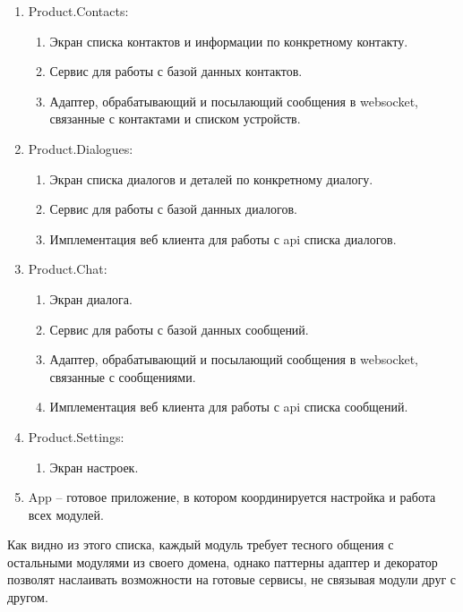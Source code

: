 \begin{enumerate}
	\item Product.Contacts:
	\begin{enumerate}
		\item Экран списка контактов и информации по конкретному контакту.
		\item Сервис для работы с базой данных контактов.
		\item Адаптер, обрабатывающий и посылающий сообщения в websocket, связанные с контактами и списком устройств.
	\end{enumerate}

	\item Product.Dialogues:
	\begin{enumerate}
		\item Экран списка диалогов и деталей по конкретному диалогу.
		\item Сервис для работы с базой данных диалогов.
		\item Имплементация веб клиента для работы с \gls{api} списка диалогов.
	\end{enumerate}

	\item Product.Chat:
	\begin{enumerate}
		\item Экран диалога.
		\item Сервис для работы с базой данных сообщений.
		\item Адаптер, обрабатывающий и посылающий сообщения в websocket, связанные с сообщениями.
		\item Имплементация веб клиента для работы с \gls{api} списка сообщений.
	\end{enumerate}

	\item Product.Settings:
	\begin{enumerate}
		\item Экран настроек.
	\end{enumerate}

	\item App -- готовое приложение, в котором координируется настройка и работа всех модулей.

\end{enumerate}

Как видно из этого списка, каждый модуль требует тесного общения с остальными модулями из своего домена, однако паттерны адаптер и декоратор позволят наслаивать возможности на готовые сервисы, не связывая модули друг с другом.